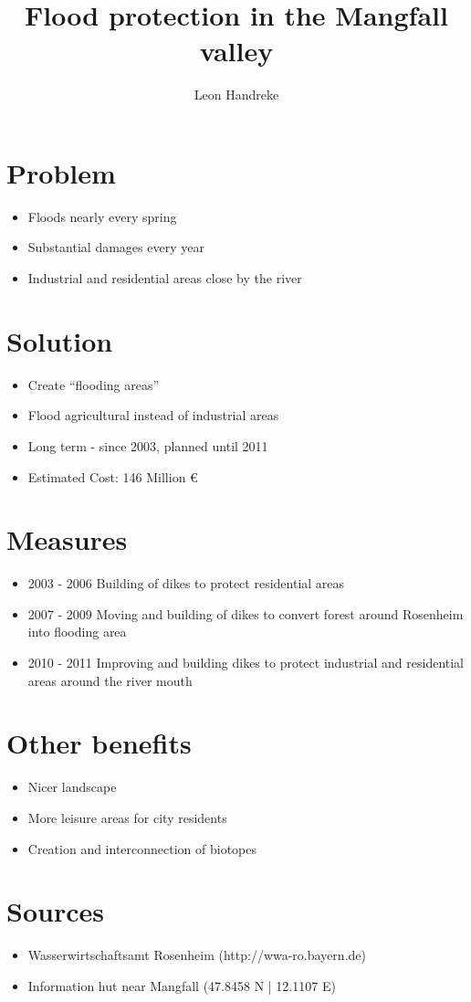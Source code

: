 \documentclass{article}
\title{Flood protection in the Mangfall valley}
\author{Leon Handreke}
\date{}                                           %
\begin{document}
\singlespacing

\maketitle
{}\selectfont

\section{Problem}
\begin{itemize}
	\item Floods nearly every spring
	\item Substantial damages every year
	\item Industrial and residential areas close by the river
\end{itemize}

\section{Solution}
\begin{itemize}
	\item Create “flooding areas”
	\item Flood agricultural instead of industrial areas
	\item Long term - since 2003, planned until 2011
	\item Estimated Cost: 146 Million \euro
\end{itemize}

\section{Measures}
\begin{itemize}
	\item 2003 - 2006 Building of dikes to protect residential areas
	\item 2007 - 2009 Moving and building of dikes to convert forest around Rosenheim into flooding area
	\item 2010 - 2011 Improving and building dikes to protect industrial and residential areas around the river mouth 
\end{itemize}

\section{Other benefits}
\begin{itemize}
	\item Nicer landscape
	\item More leisure areas for city residents
	\item Creation and interconnection of biotopes
\end{itemize}

\section{Sources}
\begin{itemize}
	\item Wasserwirtschaftsamt Rosenheim (http://wwa-ro.bayern.de)
	\item Information hut near Mangfall (47.8458 N | 12.1107 E)
\end{itemize}
\end{document}
